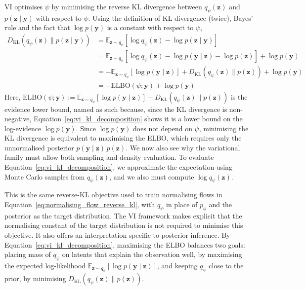 \documentclass[12pt,a4paper]{report}
\begin{document}
VI optimises $\psi$ by minimising the reverse KL divergence between $q_{\psi}(\mathbf{z})$ and $p(\mathbf{z}\mid\mathbf{y})$ with respect to $\psi$.
Using the definition of KL divergence (twice), Bayes' rule and the fact that $\log p(\mathbf{y})$ is a constant with respect to $\psi$,
\begin{align}
D_{\mathrm{KL}}\left(q_{\psi}(\mathbf{z})\parallel p(\mathbf{z}\mid\mathbf{y})\right)
&=
\mathbb{E}_{\mathbf{z}\sim q_{\psi}}
\left[
\log q_{\psi}(\mathbf{z})
-\log p(\mathbf{z}\mid\mathbf{y})
\right]
\nonumber
\\
&=
\mathbb{E}_{\mathbf{z}\sim q_{\psi}}
\left[
\log q_{\psi}(\mathbf{z})
-\log p(\mathbf{y}\mid\mathbf{z})
-\log p(\mathbf{z})
\right]
+\log p(\mathbf{y})
\nonumber
\\
&=
-\mathbb{E}_{\mathbf{z}\sim q_{\psi}}
\left[\log p(\mathbf{y}\mid\mathbf{z})\right]
+
D_{\mathrm{KL}}\left(q_{\psi}(\mathbf{z})\parallel p(\mathbf{z})\right)
+\log p(\mathbf{y})
\label{eq:vi_kl_decomposition}
\\
&=
-\mathrm{ELBO}(\psi;\mathbf{y})+\log p(\mathbf{y})
\nonumber
\end{align}
Here, $\mathrm{ELBO}(\psi;\mathbf{y}):=\mathbb{E}_{\mathbf{z}\sim q_{\psi}}\left[\log p(\mathbf{y}\mid\mathbf{z})\right]-D_{\mathrm{KL}}\left(q_{\psi}(\mathbf{z})\parallel p(\mathbf{z})\right)$ is the evidence lower bound, named as such because, since the KL divergence is non-negative, Equation~\ref{eq:vi_kl_decomposition} shows it is a lower bound on the log-evidence $\log p(\mathbf{y})$. Since $\log p(\mathbf{y})$ does not depend on $\psi$, minimising the KL divergence is equivalent to maximising the ELBO, which requires only the unnormalised posterior $p(\mathbf{y}\mid\mathbf{z})\,p(\mathbf{z})$. We now also see why the variational family must allow both sampling and density evaluation. To evaluate Equation~\ref{eq:vi_kl_decomposition}, we approximate the expectation using Monte Carlo samples from $q_{\psi}(\mathbf{z})$, and we also must compute $\log q_{\psi}(\mathbf{z})$. 

This is the same reverse-KL objective used to train normalising flows in Equation~\ref{eq:normalising_flow_reverse_kl}, with $q_{\psi}$ in place of $p_{\phi}$ and the posterior as the target distribution. The VI framework makes explicit that the normalising constant of the target distribution is not required to minimise this objective. It also offers an interpretation specific to posterior inference. By Equation~\ref{eq:vi_kl_decomposition}, maximising the ELBO balances two goals: placing mass of $q_{\psi}$ on latents that explain the observation well, by maximising the expected log-likelihood $\mathbb{E}_{\mathbf{z}\sim q_{\psi}}\left[\log p(\mathbf{y}\mid\mathbf{z})\right]$, and keeping $q_{\psi}$ close to the prior, by minimising $D_{\mathrm{KL}}\left(q_{\psi}(\mathbf{z})\parallel p(\mathbf{z})\right)$.
\end{document}
